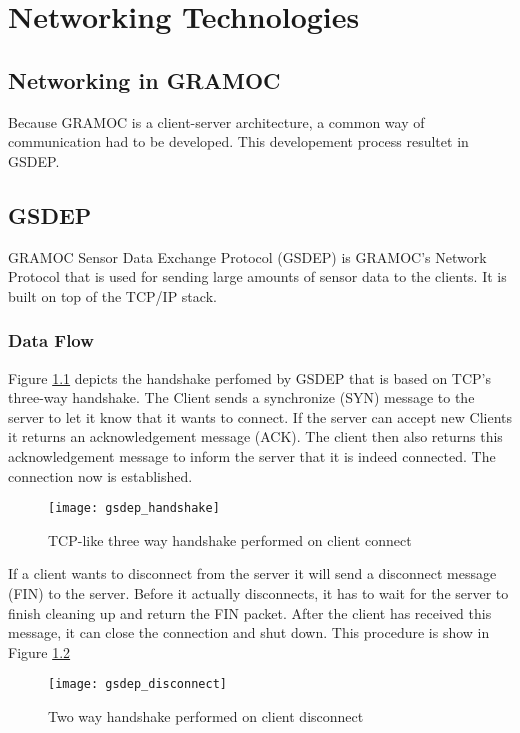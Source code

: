 \chapter{Networking Technologies}
\label{ch:networkingtechnologies}

\section{Networking in GRAMOC}

Because GRAMOC is a client-server architecture, a common way of communication had to be developed. This developement process resultet in GSDEP.

\section{GSDEP}

GRAMOC Sensor Data Exchange Protocol (GSDEP) is GRAMOC's Network Protocol that is used for sending large amounts of sensor data to the clients. It is built on top of the TCP/IP stack.

\subsection{Data Flow}

Figure \ref{fig:handshake} depicts the handshake perfomed by GSDEP that is based on TCP's three-way handshake. The Client sends a synchronize (SYN) message to the server to let it know that it wants to connect. If the server can accept new Clients it returns an acknowledgement message (ACK). The client then also returns this acknowledgement message to inform the server that it is indeed connected. The connection now is established.

\begin{figure}[H]
	\centering
	\texttt{[image: gsdep\_handshake]}
	\caption{TCP-like three way handshake performed on client connect}
	\label{fig:handshake}
\end{figure}

If a client wants to disconnect from the server it will send a disconnect message (FIN) to the server. Before it actually disconnects, it has to wait for the server to finish cleaning up and return the FIN packet. After the client has received this message, it can close the connection and shut down. This procedure is show in Figure \ref{fig:disconnect}

\begin{figure}[H]
	\centering
	\texttt{[image: gsdep\_disconnect]}
	\caption{Two way handshake performed on client disconnect}
	\label{fig:disconnect}
\end{figure}

